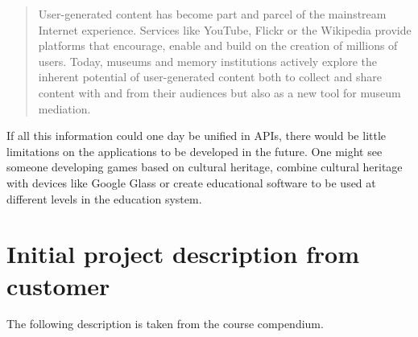\documentclass[11pt]{book}
\begin{document}
\begin{quotation}\noindent
User-generated content has become part and parcel of the mainstream Internet experience. Services like YouTube, Flickr or the Wikipedia provide platforms that encourage, enable and build on the creation of millions of users. Today, museums and memory institutions actively explore the inherent potential of user-generated content both to collect and share content with and from their audiences but also as a new tool for museum mediation.\cite{digitalHeritage}
\end{quotation}

If all this information could one day be unified in APIs, there would be little limitations on the applications to be developed in the future. One might see someone developing games based on cultural heritage, combine cultural heritage with devices like Google Glass or create educational software to be used at different levels in the education system.



\appendix
\chapter{Initial project description from customer}
The following description is taken from the course compendium\cite[p. 47]{compendium}.
\end{document}
